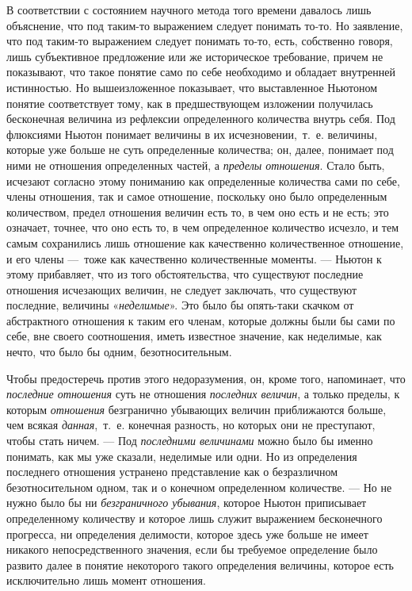 В соответствии с состоянием научного метода того времени давалось лишь
объяснение, что под таким-то выражением следует понимать то-то. Но
заявление, что под таким-то выражением следует понимать то-то, есть,
собственно говоря, лишь субъективное предложение или же историческое
требование, причем не показывают, что такое понятие само по себе необходимо
и обладает внутренней истинностью. Но вышеизложенное показывает, что
выставленное Ньютоном понятие соответствует тому, как в предшествующем
изложении получилась бесконечная величина из рефлексии определенного
количества внутрь себя. Под флюксиями Ньютон понимает величины в их
исчезновении,~т.~е. величины, которые уже больше не суть определенные
количества; он, далее, понимает под ними не отношения определенных частей,
а {\em пределы отношения}. Стало быть, исчезают
согласно этому пониманию как определенные количества сами по себе, члены
отношения, так и самое отношение, поскольку оно было определенным
количеством, предел отношения величин есть то, в чем оно есть и не есть;
это означает, точнее, что оно есть то, в чем определенное количество
исчезло, и тем самым сохранились лишь отношение как качественно
количественное отношение, и его члены —~тоже как качественно количественные
моменты. — Ньютон к этому прибавляет, что из того обстоятельства, что
существуют последние отношения исчезающих величин, не следует заключать,
что существуют последние, величины «{\em неделимые}».
Это было бы опять-таки скачком от абстрактного отношения к таким его
членам, которые должны были бы сами по себе, вне своего соотношения, иметь
известное значение, как неделимые, как нечто, что было бы одним,
безотносительным.

Чтобы предостеречь против этого недоразумения, он, кроме того, напоминает,
что {\em последние отношения} суть не отношения
{\em последних величин}, а только пределы, к которым
{\em отношения} безгранично убывающих величин
приближаются больше, чем всякая {\em данная},~т.~е.
конечная разность, но которых они не преступают, чтобы стать ничем. — Под
{\em последними величинами} можно было бы именно
понимать, как мы уже сказали, неделимые или одни. Но из определения
последнего отношения устранено представление как о безразличном
безотносительном одном, так и о конечном определенном количестве. — Но не
нужно было бы ни {\em безграничного убывания}, которое
Ньютон приписывает определенному количеству и которое лишь служит
выражением бесконечного прогресса, ни определения делимости, которое здесь
уже больше не имеет никакого непосредственного значения, если бы требуемое
определение было развито далее в понятие некоторого такого определения
величины, которое есть исключительно лишь момент отношения.

